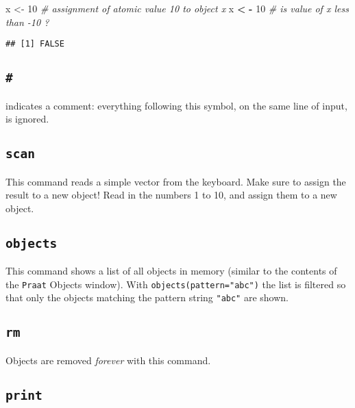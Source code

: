 \documentclass[]{book}
\newenvironment{Shaded}{\begin{snugshade}}{\end{snugshade}}
\newcommand{\CommentTok}[1]{\textcolor[rgb]{0.56,0.35,0.01}{\textit{#1}}}
\newcommand{\DecValTok}[1]{\textcolor[rgb]{0.00,0.00,0.81}{#1}}
\newcommand{\NormalTok}[1]{#1}
\newcommand{\OperatorTok}[1]{\textcolor[rgb]{0.81,0.36,0.00}{\textbf{#1}}}
\newcommand{\StringTok}[1]{\textcolor[rgb]{0.31,0.60,0.02}{#1}}
\begin{document}
\begin{Shaded}
\begin{Highlighting}[]
\NormalTok{x <-}\StringTok{ }\DecValTok{10} \CommentTok{# assignment of atomic value 10 to object x}
\NormalTok{x }\OperatorTok{<}\StringTok{ }\OperatorTok{-}\StringTok{ }\DecValTok{10} \CommentTok{# is value of x less than -10 ?}
\end{Highlighting}
\end{Shaded}

\begin{verbatim}
## [1] FALSE
\end{verbatim}

\hypertarget{section-1}{%
\subsection{\texorpdfstring{\texttt{\#}}{\#}}\label{section-1}}

indicates a comment: everything following this symbol, on the same
line of input, is ignored.

\hypertarget{scan}{%
\subsection{\texorpdfstring{\texttt{scan}}{scan}}\label{scan}}

This command reads a simple vector from the keyboard. Make sure to
assign the result to a new object! Read in the numbers 1 to 10, and
assign them to a new object.

\hypertarget{objects}{%
\subsection{\texorpdfstring{\texttt{objects}}{objects}}\label{objects}}

This command shows a list of all objects in memory (similar to the
contents of the \texttt{Praat} Objects window). With \texttt{objects(pattern="abc")} the list is filtered so that only the objects matching the pattern string \texttt{"abc"} are shown.

\hypertarget{rm}{%
\subsection{\texorpdfstring{\texttt{rm}}{rm}}\label{rm}}

Objects are removed \emph{forever} with this command.

\hypertarget{print}{%
\subsection{\texorpdfstring{\texttt{print}}{print}}\label{print}}
\end{document}
